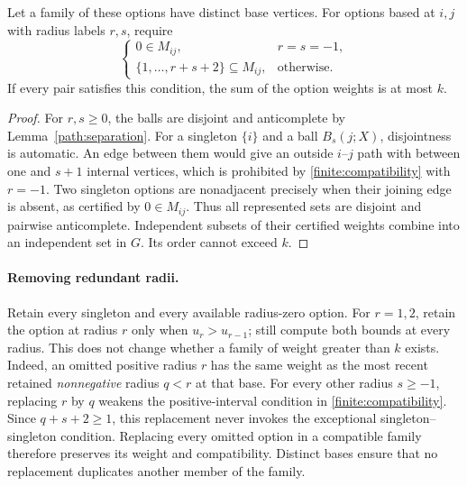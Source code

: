 \begin{lemma}\label{finite:packing}
Let a family of these options have distinct base vertices.
For options based at $i,j$ with radius labels $r,s$, require
\begin{equation}\label{finite:compatibility}
 \begin{cases}
 0\in M_{ij},&r=s=-1,\\
 \{1,\ldots,r+s+2\}\subseteq M_{ij},&\text{otherwise}.
 \end{cases}
\end{equation}
If every pair satisfies this condition, the sum of the option weights
is at most $k$.
\end{lemma}

\begin{proof}
For $r,s\ge0$, the balls are disjoint and anticomplete by
Lemma~\ref{path:separation}.  For a singleton $\{i\}$ and a ball
$B_s(j;X)$, disjointness is automatic.  An edge between them would give
an outside $i$--$j$ path with between one and $s+1$ internal vertices,
which is prohibited by \eqref{finite:compatibility} with $r=-1$.
Two singleton options are nonadjacent precisely when their joining edge
is absent, as certified by $0\in M_{ij}$.
Thus all represented sets are disjoint and pairwise anticomplete.
Independent subsets of their certified weights combine into an
independent set in $G$.  Its order cannot exceed $k$.
\end{proof}

\paragraph{Removing redundant radii.}
Retain every singleton and every available radius-zero option.
For $r=1,2$, retain the option at radius $r$ only when
$u_r>u_{r-1}$; still compute both bounds at every radius.
This does not change whether a family of weight greater than $k$
exists.  Indeed, an omitted positive radius $r$ has the same weight as
the most recent retained \emph{nonnegative} radius $q<r$ at that base.
For every other radius $s\ge-1$, replacing $r$ by $q$ weakens the
positive-interval condition in \eqref{finite:compatibility}.
Since $q+s+2\ge1$, this replacement never invokes the exceptional
singleton--singleton condition.
Replacing every omitted option in a compatible family therefore
preserves its weight and compatibility.  Distinct bases ensure that
no replacement duplicates another member of the family.

